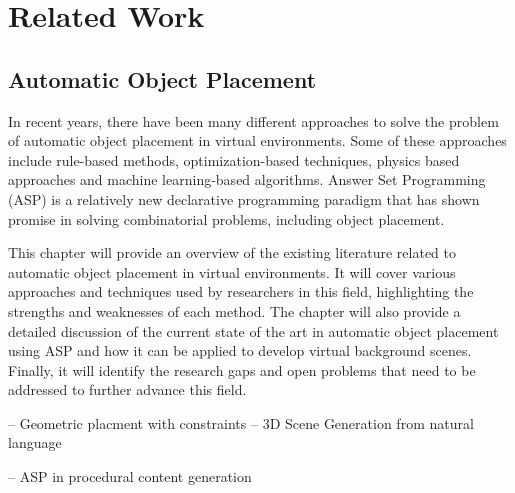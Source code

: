 
\chapter{Related Work}\label{ch:related-work}

\section{Automatic Object Placement}

In recent years, there have been many different
approaches to solve the problem of automatic object placement in virtual
environments. Some of these approaches include rule-based methods,
optimization-based techniques, physics based approaches and machine learning-based algorithms. 
Answer Set Programming (ASP) is a relatively new declarative programming paradigm
that has shown promise in solving combinatorial problems, including object
placement.

This chapter will provide an overview of the existing literature related to
automatic object placement in virtual environments. It will cover various
approaches and techniques used by researchers in this field, highlighting the
strengths and weaknesses of each method. The chapter will also provide a
detailed discussion of the current state of the art in automatic object
placement using ASP and how it can be applied to develop virtual background
scenes. Finally, it will identify the research gaps and open problems that
need to be addressed to further advance this field.

\cite{Shinya_1995} -- Geometric placment with constraints
\cite{Seversky_2006} -- 3D Scene Generation from natural language

\cite{Smith_2011} -- ASP in procedural content generation
